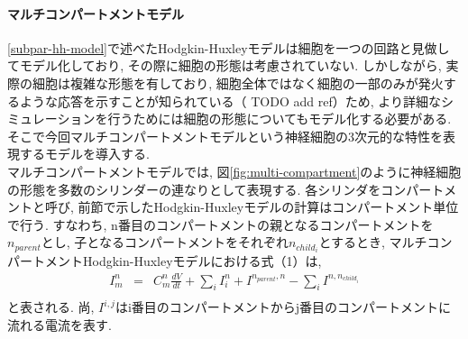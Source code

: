 \paragraph{マルチコンパートメントモデル}
\ref{subpar-hh-model}で述べたHodgkin-Huxleyモデルは細胞を一つの回路と見做してモデル化しており,
その際に細胞の形態は考慮されていない. しかしながら, 実際の細胞は複雑な形態を有しており,
細胞全体ではなく細胞の一部のみが発火するような応答を示すことが知られている（ TODO add ref）ため,
より詳細なシミュレーションを行うためには細胞の形態についてもモデル化する必要がある.\\
そこで今回マルチコンパートメントモデルという神経細胞の3次元的な特性を表現するモデルを導入する.\\
マルチコンパートメントモデルでは, 図\ref{fig:multi-compartment}のように神経細胞の形態を多数のシリンダーの連なりとして表現する.
各シリンダをコンパートメントと呼び, 前節で示したHodgkin-Huxleyモデルの計算はコンパートメント単位で行う. すなわち,
n番目のコンパートメントの親となるコンパートメントを$n_{parent}$とし, 子となるコンパートメントをそれぞれ$n_{child_{i}}$とするとき,
マルチコンパートメントHodgkin-Huxleyモデルにおける式（1）は,
\begin{eqnarray}
  I_{m}^{n} & = & C_{m}^{n}\frac{dV}{dt} + \sum_{i} I_{i}^{n} + I^{n_{parent}, n} - \sum_{i} I^{n, n_{child_{i}}}\\
\end{eqnarray}
と表される. 尚, $I^{i, j}$はi番目のコンパートメントからj番目のコンパートメントに流れる電流を表す.


